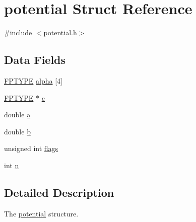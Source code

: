 \hypertarget{structpotential}{\section{potential Struct Reference}
\label{structpotential}
}


{\ttfamily \#include $<$potential.\-h$>$}

\subsection*{Data Fields}
\begin{DoxyCompactItemize}
\item 
\hyperlink{fptype_8h_a78f09a67f3e652a3b25e085a0082a835}{F\-P\-T\-Y\-P\-E} \hyperlink{structpotential_a90cc93057627c97aeea54021b8758532}{alpha} \mbox{[}4\mbox{]}
\item 
\hyperlink{fptype_8h_a78f09a67f3e652a3b25e085a0082a835}{F\-P\-T\-Y\-P\-E} $\ast$ \hyperlink{structpotential_a30fc290af674fbe78d5ea515353d4ec2}{c}
\item 
double \hyperlink{structpotential_a1031d0e0a97a340abfe0a6ab9e831045}{a}
\item 
double \hyperlink{structpotential_a1510a66dacf9cf3586de5fc89ae2a073}{b}
\item 
unsigned int \hyperlink{structpotential_ac92588540e8c1d014a08cd8a45462b19}{flags}
\item 
int \hyperlink{structpotential_a76f11d9a0a47b94f72c2d0e77fb32240}{n}
\end{DoxyCompactItemize}


\subsection{Detailed Description}
The \hyperlink{structpotential}{potential} structure. 

